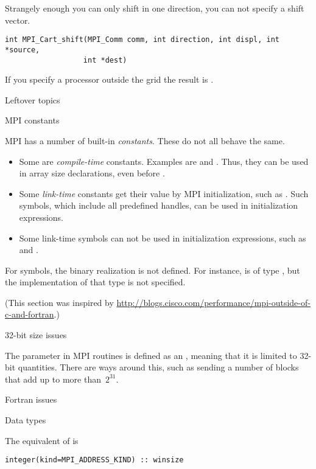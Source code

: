Strangely enough you can only shift in one direction, you can not
specify a shift vector.
\begin{verbatim}
int MPI_Cart_shift(MPI_Comm comm, int direction, int displ, int *source, 
                  int *dest)
\end{verbatim}
If you specify a processor outside the grid
the result is .

 {Leftover topics}

 {MPI constants}

MPI has a number of built-in \emph{constants}. These do not all behave
the same.
\begin{itemize}
\item Some are \emph{compile-time}
  constants. Examples are  and
  . Thus, they can be used in
  array size declarations, even before .
\item Some \emph{link-time}
  constants get their value by MPI initialization, such as
  . Such symbols, which include all
  predefined handles, can be used in initialization expressions.
\item Some link-time symbols can not be used in initialization
  expressions, such as  and .
\end{itemize}

For symbols, the binary realization is not defined. For instance,
 is of type , but
the implementation of that type is not specified.

(This section was inspired by
\url{http://blogs.cisco.com/performance/mpi-outside-of-c-and-fortran}.)


 {32-bit size issues}

The  parameter in MPI routines is defined as an ,
meaning that it is limited to 32-bit quantities.  There are ways
around this, such as sending a number of
 blocks that add up to more than~$2^{31}$.

 {Fortran issues}
\label{sec:ref:mpi-fortran}

 {Data types}

The equivalent of  is
\begin{verbatim}
integer(kind=MPI_ADDRESS_KIND) :: winsize
\end{verbatim}

